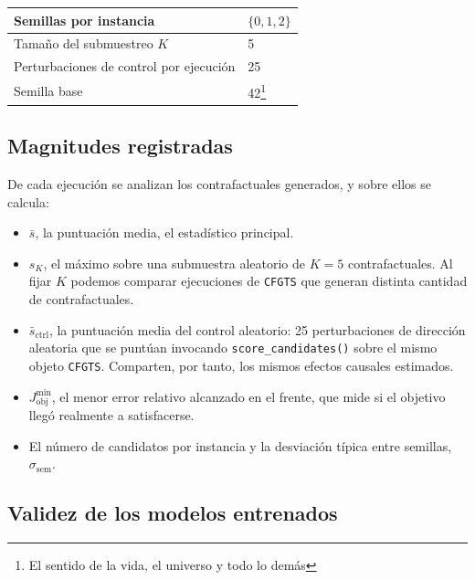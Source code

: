 \documentclass[12pt]{report} %
\begin{document}
\begin{table}[H]
{\begin{tabular}{|p{6.2cm}|p{5.8cm}|}
            Semillas por instancia                                & $\{0, 1, 2\}$                                                   \\
            \hline
            Tamaño del submuestreo $K$                            & 5                                                               \\
            \hline
            Perturbaciones de control por ejecución               & 25                                                              \\
            \hline
            Semilla base                                          & 42\footnote{El sentido de la vida, el universo y todo lo demás} \\
            \hline
        \end{tabular}}
\end{table}

\subsection{Magnitudes registradas}

De cada ejecución se analizan los contrafactuales generados, y sobre ellos se calcula:

\begin{itemize}
    \item $\bar{s}$, la puntuación media, el estadístico principal.
    \item $s_{K}$, el máximo sobre una submuestra aleatorio de $K = 5$ contrafactuales. Al fijar $K$ podemos comparar ejecuciones de \texttt{CFGTS} que generan distinta cantidad de contrafactuales.
    \item $\bar{s}_{\text{ctrl}}$, la puntuación media del control aleatorio: 25 perturbaciones de dirección aleatoria que se puntúan invocando \texttt{score\_candidates()} sobre el mismo objeto \texttt{CFGTS}. Comparten, por tanto, los mismos efectos causales estimados.
    \item $J_{\text{obj}}^{\min}$, el menor error relativo alcanzado en el frente, que mide si el objetivo llegó realmente a satisfacerse.
    \item El número de candidatos por instancia y la desviación típica entre semillas, $\sigma_{\text{sem}}$.
\end{itemize}

\subsection{Validez de los modelos entrenados}
\end{document}
